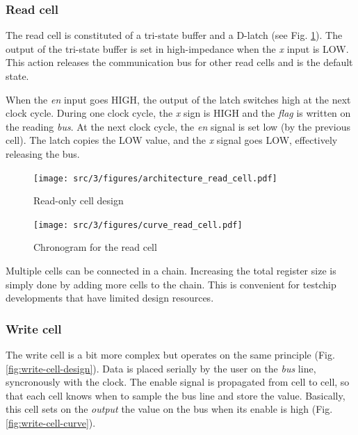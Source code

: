 \subsubsection{Read cell}

The read cell is constituted of a tri-state buffer and a D-latch (see Fig. \ref{fig:read-cell-design}).
The output of the tri-state buffer is set in high-impedance when the \textit{x} input is LOW.
This action releases the communication bus for other read cells and is the default state.

When the \textit{en} input goes HIGH, the output of the latch switches high at the next clock cycle.
During one clock cycle, the \textit{x} sign is HIGH and the \textit{flag} is written on the reading \textit{bus}.
At the next clock cycle, the \textit{en} signal is set low (by the previous cell).
The latch copies the LOW value, and the \textit{x} signal goes LOW, effectively releasing the bus.

\begin{figure}[!h]
  \centering
  \texttt{[image: src/3/figures/architecture\_read\_cell.pdf]}
  \caption{Read-only cell design}
  \label{fig:read-cell-design}
\end{figure}

\begin{figure}[!h]
  \centering
  \texttt{[image: src/3/figures/curve\_read\_cell.pdf]}
  \caption{Chronogram for the read cell}
  \label{fig:read-cell-curve}
\end{figure}

Multiple cells can be connected in a chain.
Increasing the total register size is simply done by adding more cells to the chain.
This is convenient for testchip developments that have limited design resources.

\subsubsection{Write cell}

The write cell is a bit more complex but operates on the same principle (Fig. \ref{fig:write-cell-design}).
Data is placed serially by the user on the \textit{bus} line, syncronously with the clock.
The enable signal is propagated from cell to cell, so that each cell knows when to sample the bus line and store the value.
Basically, this cell sets on the \textit{output} the value on the bus when its enable is high (Fig. \ref{fig:write-cell-curve}).

